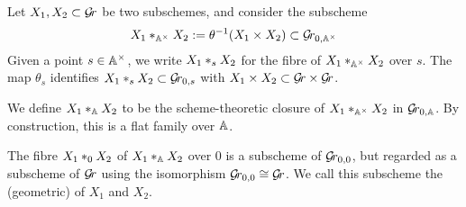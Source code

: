 \documentclass[draft]{article} %
\begin{document}
Let $ X_1, X_2 \subset \Gr$ be two subschemes, and consider the subscheme 
$$ 
    X_1 \bdfamo X_2 := \theta^{-1}(X_1 \times X_2) \subset \Gr_{0, \AA^\times} 
$$
% 
Given a point $ s \in \Ax$, we write $ X_1 \bdfamf X_2  $ for the fibre of $ X_1 \bdfamo X_2 $ over $s$. The map $ \theta_s$ identifies $ X_1 \bdfamf X_2 \subset \Gr_{0,s}$ with $ X_1 \times X_2 \subset \Gr \times \Gr$.


We define $ X_1 \ast_{\AA} X_2 $ to be the scheme-theoretic closure of $  X_1 \bdfamo X_2 $ in $ \Grbd $. By construction, this is a flat family over $ \AA$.

The fibre $ X_1 \geofu X_2$ of $ X_1 \ast_{\AA} X_2 $ over $0$ is a subscheme of $ \Gr_{0,0} $, but regarded as a subscheme of $ \Gr $ using {the isomorphism} $\Gr_{0,0} \cong \Gr $.  We call this subscheme the (geometric)  of $ X_1 $ and $ X_2$.

% 
% 

\end{document}
